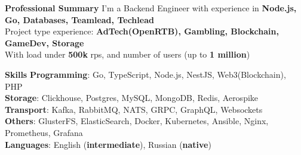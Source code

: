 \documentclass{resume}
\begin{document}

\begin{rSection}{\textbf{Professional Summary}}
{
    I'm a Backend Engineer with experience in \textbf{Node.js, Go, Databases, Teamlead, Techlead}
 \\ Project type experience: \textbf{AdTech(OpenRTB), Gambling, Blockchain, GameDev, Storage}
 \\ With load under \textbf{500k} rps, and  number of users (up to \textbf{1 million})
}

\end{rSection}
\begin{rSection}{\textbf{Skills}}
    \textbf{Programming}: Go, TypeScript, Node.js, NestJS, Web3(Blockchain), PHP
    \\ \textbf{Storage}: Clickhouse, Postgres, MySQL, MongoDB, Redis, Aerospike
    \\ \textbf{Transport}: Kafka, RabbitMQ, NATS, GRPC, GraphQL, Websockets
    \\ \textbf{Others}: GlusterFS, ElasticSearch, Docker, Kubernetes, Ansible, Nginx, Prometheus, Grafana
    \\ \textbf{Languages}: English ({\textbf{intermediate}}), Russian ({\textbf{native}})
\end{rSection}
\end{document}
